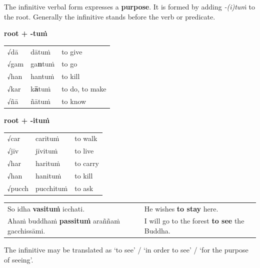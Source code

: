 \documentclass[11pt,oneside]{memoir}
\begin{document}
The infinitive verbal form expresses a \textbf{purpose}.
It is formed by adding \emph{-(i)tuṁ} to the root.
Generally the infinitive stands before the verb or predicate.

\begin{multicols}{2}

\textbf{root + -tuṁ}

\begin{center}
\begin{tabular}{lll}
√dā & dātuṁ & to give\\
√gam & ga\textbf{n}tuṁ & to go\\
√han & hantuṁ & to kill\\
√kar & k\textbf{ā}tuṁ & to do, to make\\
√ñā & ñātuṁ & to know\\
\end{tabular}
\end{center}

\columnbreak

\textbf{root + -ituṁ}

\begin{center}
\begin{tabular}{lll}
√car & carituṁ & to walk\\
√jīv & jīvituṁ & to live\\
√har & harituṁ & to carry\\
√han & hanituṁ & to kill\\
√pucch & pucchituṁ & to ask\\
\end{tabular}
\end{center}

\end{multicols}

\begin{center}
\begin{tabular}{ll}
So idha \textbf{vasituṁ} icchati. & He wishes \textbf{to stay} here.\\
Ahaṁ buddhaṁ \textbf{passituṁ} araññaṁ gacchissāmi. & I will go to the forest \textbf{to see} the Buddha.\\
\end{tabular}
\end{center}

The infinitive may be translated as `to see' / `in order to see' / `for the purpose of seeing'.

\renewcommand{\arraystretch}{1.8}
\end{document}
